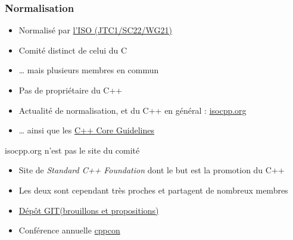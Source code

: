 \documentclass[C++.tex]{subfiles}
\begin{document}
\begin{frame}[fragile]
	\frametitle{Normalisation}
	\begin{itemize}
		\item Normalisé par \href{http://www.open-std.org/JTC1/SC22/WG21/}{l'ISO (JTC1/SC22/WG21\linklogo)}
		\item Comité distinct de celui du C


		\item \ldots{} mais plusieurs membres en commun
		\item Pas de propriétaire du C++


		\item Actualité de normalisation, et du C++ en général : \href{https://isocpp.org/}{isocpp.org\linklogo}
		\item \ldots{} ainsi que les \href{https://isocpp.github.io/CppCoreGuidelines/CppCoreGuidelines}{C++ Core Guidelines\linklogo}
	\end{itemize}

	\begin{alertblock}{isocpp.org n'est pas le site du comité}
		\begin{itemize}
			\item Site de \textit{Standard C++ Foundation} dont le but est la promotion du C++
			\item Les deux sont cependant très proches et partagent de nombreux membres
		\end{itemize}
	\end{alertblock}

	\begin{itemize}
		\item \href{https://github.com/cplusplus}{Dépôt GIT\linklogo (brouillons et propositions)}
		\item Conférence annuelle \href{http://cppcon.org/}{cppcon\linklogo}
	\end{itemize}
\end{frame}
\end{document}
